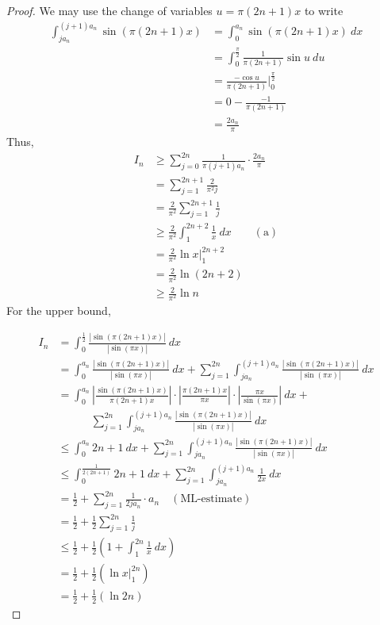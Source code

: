 \documentclass[12pt, reqno]{amsart}
\theoremstyle{definition}
\theoremstyle{remark}
\begin{document}
\begin{itemize}
\begin{itemize}
\begin{proof}
We may use the change of variables $u= \pi(2n+1)x$ to write \begin{align*}
\int_{ja_{n}}^{(j+1)a_{n}}\sin(\pi(2n+1)x)&= \int_{0}^{a_{n}}\sin(\pi(2n+1)x)\ dx\\
&= \int_{0}^{\frac{\pi}{2}} \frac{1}{\pi(2n+1)}\sin u\ du\\
&= \frac{-\cos u}{\pi(2n+1)}\bigg|_{0}^{\frac{\pi}{2}}\\
&= 0 - \frac{-1}{\pi(2n+1)}\\
&= \frac{2a_{n}}{\pi}
\end{align*}
Thus, \begin{align*}
I_{n}&\ge \sum_{j=0}^{2n} \frac{1}{\pi(j+1)a_{n}}\cdot \frac{2a_{n}}{\pi}\\
&= \sum_{j=1}^{2n+1} \frac{2}{\pi^{2}j}\\
&= \frac{2}{\pi^{2}}\sum_{j=1}^{2n+1} \frac{1}{j}\\
&\ge \frac{2}{\pi^{2}}\int_{1}^{2n+2} \frac{1}{x}\ dx\quad\quad(\text{a})\\
&= \frac{2}{\pi^{2}}\ln x\bigg|^{2n+2}_{1}\\
&= \frac{2}{\pi^{2}}\ln(2n+2)\\
&\ge \frac{2}{\pi^{2}}\ln n
\end{align*}
For the upper bound,

\begin{align*}
I_{n} &= \int_{0}^{\frac{1}{2}}\frac{|\sin (\pi(2n+1)x)|}{|\sin(\pi x)|}\ dx\\
&= \int_{0}^{a_{n}}\frac{|\sin (\pi(2n+1)x)|}{|\sin(\pi x)|}\ dx+\sum_{j=1}^{2n}\int_{ja_{n}}^{(j+1)a_{n}} \frac{|\sin (\pi(2n+1)x)|}{|\sin(\pi x)|}\ dx\\
&= \int_{0}^{a_{n}}\left|\frac{\sin(\pi(2n+1)x)}{\pi(2n+1)x}\right| \cdot\left| \frac{\pi(2n+1)x}{\pi x}\right|\cdot \left| \frac{\pi x}{\sin(\pi x)}\right|\ dx+\\
&\quad\quad\quad\sum_{j=1}^{2n}\int_{ja_{n}}^{(j+1)a_{n}} \frac{|\sin (\pi(2n+1)x)|}{|\sin(\pi x)|}\ dx\\
&\le \int_{0}^{a_{n}}2n+1\ dx+\sum_{j=1}^{2n}\int_{ja_{n}}^{(j+1)a_{n}} \frac{|\sin (\pi(2n+1)x)|}{|\sin(\pi x)|}\ dx\\
&\le \int_{0}^{\frac{1}{2(2n+1)}}2n+1 \ dx+\sum_{j=1}^{2n}\int_{ja_{n}}^{(j+1)a_{n}} \frac{1}{2x}\ dx\\
&= \frac{1}{2}+\sum_{j=1}^{2n} \frac{1}{2ja_{n}}\cdot a_{n}\quad(\text{ML-estimate})\\
&= \frac{1}{2}+ \frac{1}{2}\sum_{j=1}^{2n} \frac{1}{j}\\
&\le \frac{1}{2}+ \frac{1}{2}\left(1+\int_{1}^{2n} \frac{1}{x}\ dx\right)\\
&= \frac{1}{2}+ \frac{1}{2}\left( \ln x\bigg|_{1}^{2n}\right)\\
&= \frac{1}{2}+ \frac{1}{2}(\ln 2n)
\end{align*}


\end{proof}
\end{itemize}
\end{itemize}
\end{document}
